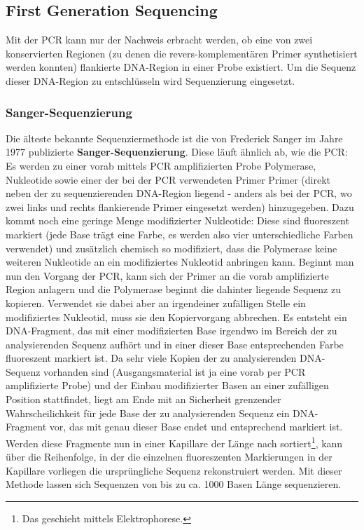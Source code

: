 \subsection{First Generation Sequencing}

Mit der PCR kann nur der Nachweis erbracht werden, ob eine von zwei konservierten Regionen (zu denen die revers-komplementären Primer synthetisiert werden konnten) flankierte DNA-Region in einer Probe existiert. Um die Sequenz dieser DNA-Region zu entschlüsseln wird Sequenzierung eingesetzt. 

\subsubsection{Sanger-Sequenzierung}

Die älteste bekannte Sequenziermethode ist die von Frederick Sanger im Jahre 1977 publizierte \textbf{Sanger-Sequenzierung}. Diese läuft ähnlich ab, wie die PCR: Es werden zu einer vorab mittels PCR amplifizierten Probe Polymerase, Nukleotide sowie einer der bei der PCR verwendeten Primer Primer (direkt neben der zu sequenzierenden DNA-Region liegend - anders als bei der PCR, wo zwei links und rechts flankierende Primer eingesetzt werden) hinzugegeben. Dazu kommt noch eine geringe Menge modifizierter Nukleotide: Diese sind fluoreszent markiert (jede Base trägt eine Farbe, es werden also vier unterschiedliche Farben verwendet) und zusätzlich chemisch so modifiziert, dass die Polymerase keine weiteren Nukleotide an ein modifiziertes Nukleotid anbringen kann. Beginnt man nun den Vorgang der PCR, kann sich der Primer an die vorab amplifizierte Region anlagern und die Polymerase beginnt die dahinter liegende Sequenz zu kopieren. Verwendet sie dabei aber an irgendeiner zufälligen Stelle ein modifiziertes Nukleotid, muss sie den Kopiervorgang abbrechen. Es entsteht ein DNA-Fragment, das mit einer modifizierten Base irgendwo im Bereich der zu analysierenden Sequenz aufhört und in einer dieser Base entsprechenden Farbe fluoreszent markiert ist. Da sehr viele Kopien der zu analysierenden DNA-Sequenz vorhanden sind (Ausgangsmaterial ist ja eine vorab per PCR amplifizierte Probe) und der Einbau modifizierter Basen an einer zufälligen Position stattfindet, liegt am Ende mit an Sicherheit grenzender Wahrscheilichkeit für jede Base der zu analysierenden Sequenz ein DNA-Fragment vor, das mit genau dieser Base endet und entsprechend markiert ist. Werden diese Fragmente nun in einer Kapillare der Länge nach sortiert\footnote{Das geschieht mittels Elektrophorese.}, kann über die Reihenfolge, in der die einzelnen fluoreszenten Markierungen in der Kapillare vorliegen die ursprüngliche Sequenz rekonstruiert werden. Mit dieser Methode lassen sich Sequenzen von bis zu ca. 1000 Basen Länge sequenzieren. 

